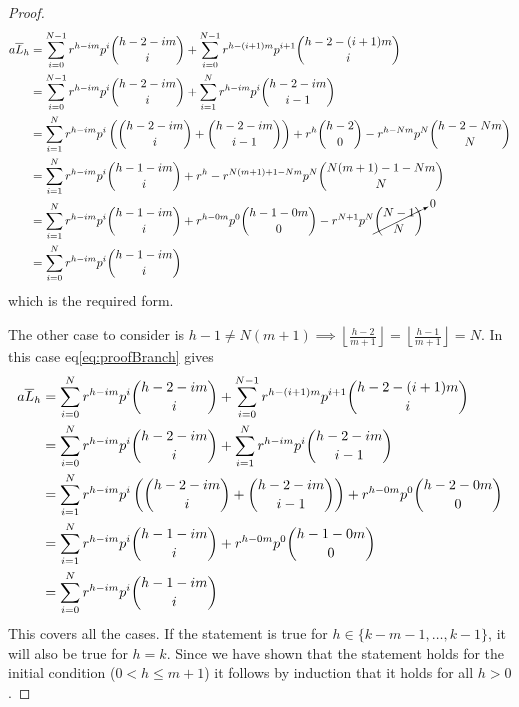 \begin{proof}
\begin{align*}
	a\overline{L}_h &= \sum_{i=0}^{N-1} r^{h-im}p^{i}{h-2-im \choose i} +
         \sum_{i=0}^{N-1} r^{h-(i+1)m}p^{i+1}{h-2-(i+1)m \choose i}\\
         &= \sum_{i=0}^{N-1} r^{h-im}p^{i}{h-2-im \choose i} +
         \sum_{i=1}^{N} r^{h-im}p^{i}{h-2-im \choose i-1} \\
         &= \sum_{i=1}^{N} r^{h-im}p^{i}\left({h-2-im \choose i} + {h-2-im \choose i-1}\right)
         + r^{h}{h-2 \choose 0} - r^{h-Nm}p^{N}{h-2-Nm \choose N}\\
         &= \sum_{i=1}^{N} r^{h-im}p^{i}{h-1-im \choose i} + r^h -
         r^{N(m+1)+1-Nm}p^{N}{N(m+1)-1-Nm \choose N}\\
         &= \sum_{i=1}^{N} r^{h-im}p^{i}{h-1-im \choose i} + r^{h-0m}p^0{h-1-0m \choose 0} -
         r^{N+1}p^{N}\cancelto{0}{{N-1 \choose N}}\\
         &= \sum_{i=0}^{N} r^{h-im}p^{i}{h-1-im \choose i}
\end{align*}
which is the required form.

\noindent The other case to consider is $h-1 \neq N(m+1) \implies \left\lfloor{\frac{h-2}{m+1}}\right\rfloor = \left\lfloor{\frac{h-1}{m+1}}\right\rfloor = N$. In this case eq\ref{eq:proofBranch} gives
\begin{align*}
    a\overline{L}_h &= \sum_{i=0}^{N} r^{h-im}p^{i}{h-2-im \choose i} +
          \sum_{i=0}^{N-1} r^{h-(i+1)m}p^{i+1}{h-2-(i+1)m \choose i}\\
          &= \sum_{i=0}^{N} r^{h-im}p^{i}{h-2-im \choose i} +
          \sum_{i=1}^{N} r^{h-im}p^{i}{h-2-im \choose i-1}\\
          &= \sum_{i=1}^{N} r^{h-im}p^{i}\left({h-2-im \choose i} +
          {h-2-im \choose i-1}\right) + r^{h-0m}p^{0}{h-2-0m \choose 0}\\
          &= \sum_{i=1}^{N} r^{h-im}p^{i}{h-1-im \choose i} + r^{h-0m}p^{0}{h-1-0m \choose 0}\\
          &= \sum_{i=0}^{N} r^{h-im}p^{i}{h-1-im \choose i}
\end{align*}
This covers all the cases. If the statement is true for $h \in \{k-m-1,\ldots,k-1\}$, it will also be true for $h = k$. Since we have shown that the statement holds for the initial condition ($0 < h \leq m+1$) it follows by induction that it holds for all $h > 0$.
\end{proof}

%
